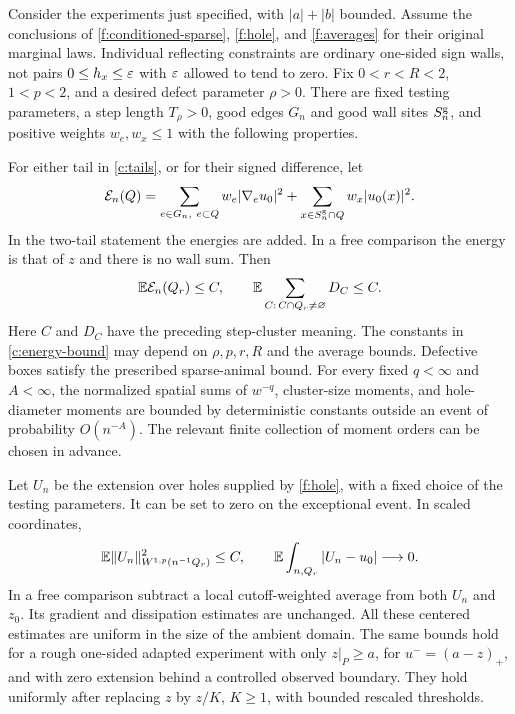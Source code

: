 \begin{theorem}\label{c:comparison}
Consider the experiments just specified, with $|a|+|b|$ bounded. Assume
the conclusions of \ref{f:conditioned-sparse}, \ref{f:hole}, and \ref{f:averages}
for their original marginal laws. Individual reflecting constraints are
ordinary one-sided sign walls, not pairs $0\le h_x\le\varepsilon$ with
$\varepsilon$ allowed to tend to zero. Fix $0<r<R<2$, $1<p<2$, and a desired
defect parameter $\rho>0$. There are fixed testing parameters, a step
length $T_\rho>0$, good edges $G_n$ and good wall sites $S_n^{\rm g}$,
and positive weights $w_e,w_x\le1$ with the following properties.

For either tail in \eqref{c:tails}, or for their signed difference, let
\begin{equation}\label{c:energy}
 \mathcal E_n(Q)=
 \sum_{e\in G_n,\ e\subset Q}w_e|\nabla_e u_0|^2
 +\sum_{x\in S_n^{\rm g}\cap Q}w_x|u_0(x)|^2.
\end{equation}
In the two-tail statement the energies are added. In a free comparison
the energy is that of $z$ and there is no wall sum. Then
\begin{equation}\label{c:energy-bound}
 \mathbb E\mathcal E_n(Q_r)\le C,\qquad
 \mathbb E\sum_{C:\,C\cap Q_r\ne\varnothing}D_C\le C.
\end{equation}
Here $C$ and $D_C$ have the preceding step-cluster meaning. The constants in
\eqref{c:energy-bound} may depend on $\rho,p,r,R$ and the average bounds.
Defective boxes satisfy the prescribed sparse-animal bound. For every
fixed $q<\infty$ and $A<\infty$, the normalized spatial sums of
$w^{-q}$, cluster-size moments, and hole-diameter moments are bounded by
deterministic constants outside an event of probability $O(n^{-A})$.
The relevant finite collection of moment orders can be chosen in advance.

Let $U_n$ be the extension over holes supplied by \ref{f:hole}, with a
fixed choice of the testing parameters. It can be set to zero on the
exceptional event. In scaled coordinates,
\begin{equation}\label{c:compactness}
 \mathbb E\|U_n\|_{W^{1,p}(n^{-1}Q_r)}^2\le C,\qquad
 \mathbb E\int_{n,Q_r}|U_n-u_0|\longrightarrow0.
\end{equation}
In a free comparison subtract a local cutoff-weighted average from both
$U_n$ and $z_0$. Its gradient and dissipation estimates are unchanged.
All these centered estimates are uniform in the size of the ambient
domain. The same bounds hold for a rough one-sided adapted experiment
with only $z|_P\ge a$, for $u^-=(a-z)_+$, and with zero extension behind
a controlled observed boundary. They hold uniformly after replacing $z$
by $z/K$, $K\ge1$, with bounded rescaled thresholds.


\end{theorem}
